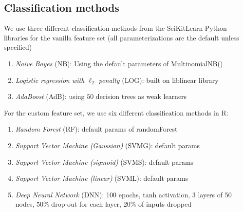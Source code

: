 \documentclass{article} %
\begin{document}
\subsection{Classification methods}

We use three different classification methods from the SciKitLearn Python libraries for the vanilla feature set (all parameterizations are the default unless specified)
\begin{enumerate}
\item \emph{Naive Bayes} (NB): Using the default parameters of MultinomialNB()
\item \emph{Logistic regression with $\ell_2$ penalty} (LOG): built on liblinear library
\item \emph{AdaBoost} (AdB): using $50$ decision trees as weak learners
\end{enumerate}

For the custom feature set, we use six different classification methods in R:
\begin{enumerate}
\item \emph{Random Forest} (RF): default params of randomForest
\item \emph{Support Vector Machine (Gaussian)} (SVMG): default params
\item \emph{Support Vector Machine (sigmoid)} (SVMS): default params
\item \emph{Support Vector Machine (linear)} (SVML): default params
\item \emph{Deep Neural Network} (DNN): 100 epochs, tanh activation, 3 layers of 50 nodes, 50\% drop-out for each layer, 20\% of inputs dropped
\end{enumerate}
\end{document}
